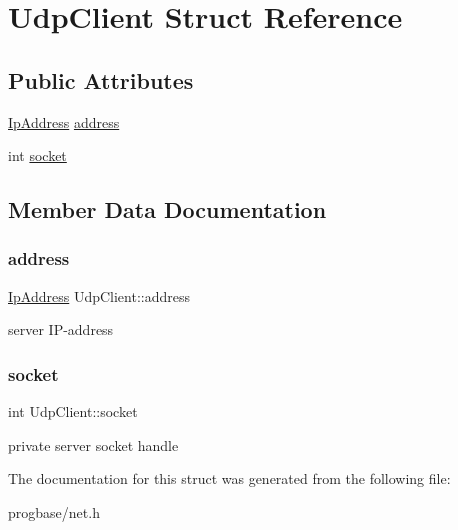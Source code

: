 \hypertarget{struct_udp_client}{}\section{Udp\+Client Struct Reference}
\label{struct_udp_client}
\subsection*{Public Attributes}
\begin{DoxyCompactItemize}
\item 
\hyperlink{struct_ip_address}{Ip\+Address} \hyperlink{struct_udp_client_ae5519ddaec3fbe64088adc85cb7f3815}{address}
\item 
int \hyperlink{struct_udp_client_a07f2cf21b6167b06902a76d22a6bd0a5}{socket}
\end{DoxyCompactItemize}


\subsection{Member Data Documentation}
\mbox{\label{struct_udp_client_ae5519ddaec3fbe64088adc85cb7f3815}} 
\subsubsection{\texorpdfstring{address}{address}}
{\footnotesize\ttfamily \hyperlink{struct_ip_address}{Ip\+Address} Udp\+Client\+::address}

server I\+P-\/address \mbox{\label{struct_udp_client_a07f2cf21b6167b06902a76d22a6bd0a5}} 
\subsubsection{\texorpdfstring{socket}{socket}}
{\footnotesize\ttfamily int Udp\+Client\+::socket}

private server socket handle 

The documentation for this struct was generated from the following file\+:\begin{DoxyCompactItemize}
\item 
progbase/net.\+h\end{DoxyCompactItemize}
